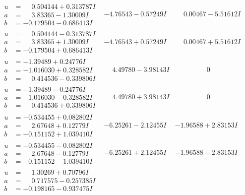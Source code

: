 \documentclass[1p]{elsarticle_modified}
\theoremstyle{definition}
\begin{document}
$$\begin{array}{c|c|c}
\begin{aligned}
u &= \phantom{-}0.504144 + 0.313787 I \\
a &= \phantom{-}3.83365 - 1.30009 I \\
b &= -0.179504 - 0.686413 I\end{aligned}
 & -4.76543 - 0.57249 I & \phantom{-}0.00467 - 5.51612 I \\ \hline\begin{aligned}
u &= \phantom{-}0.504144 - 0.313787 I \\
a &= \phantom{-}3.83365 + 1.30009 I \\
b &= -0.179504 + 0.686413 I\end{aligned}
 & -4.76543 + 0.57249 I & \phantom{-}0.00467 + 5.51612 I \\ \hline\begin{aligned}
u &= -1.39489 + 0.24776 I \\
a &= -1.016030 + 0.328582 I \\
b &= \phantom{-}0.414536 - 0.339806 I\end{aligned}
 & \phantom{-}4.49780 - 3.98143 I & \phantom{-0.000000 } 0 \\ \hline\begin{aligned}
u &= -1.39489 - 0.24776 I \\
a &= -1.016030 - 0.328582 I \\
b &= \phantom{-}0.414536 + 0.339806 I\end{aligned}
 & \phantom{-}4.49780 + 3.98143 I & \phantom{-0.000000 } 0 \\ \hline\begin{aligned}
u &= -0.534455 + 0.082802 I \\
a &= \phantom{-}2.67648 + 0.12779 I \\
b &= -0.151152 + 1.039410 I\end{aligned}
 & -6.25261 - 2.12455 I & -1.96588 + 2.83153 I \\ \hline\begin{aligned}
u &= -0.534455 - 0.082802 I \\
a &= \phantom{-}2.67648 - 0.12779 I \\
b &= -0.151152 - 1.039410 I\end{aligned}
 & -6.25261 + 2.12455 I & -1.96588 - 2.83153 I \\ \hline\begin{aligned}
u &= \phantom{-}1.30269 + 0.70796 I \\
a &= \phantom{-}0.717575 - 0.257385 I \\
b &= -0.198165 - 0.937475 I\end{aligned}

\end{array}$$
\end{document}
